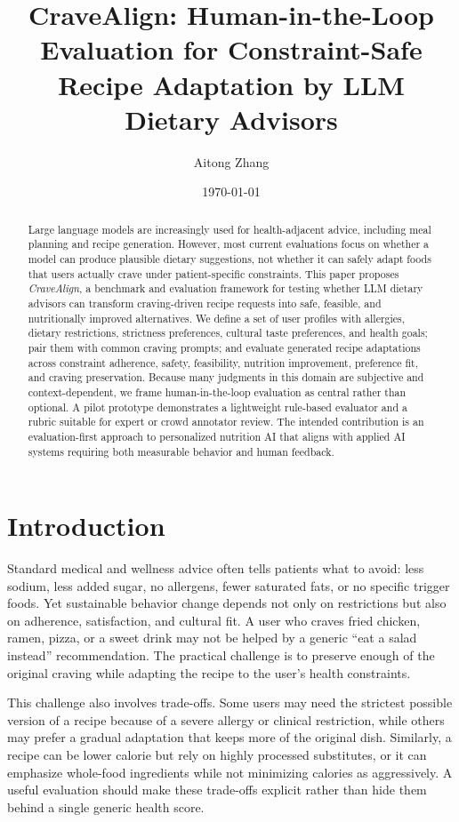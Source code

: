 \documentclass[11pt]{article}
\title{CraveAlign: Human-in-the-Loop Evaluation for Constraint-Safe Recipe Adaptation by LLM Dietary Advisors}
\author{Aitong Zhang}
\date{\today}
\begin{document}
\maketitle

\begin{abstract}
Large language models are increasingly used for health-adjacent advice, including meal planning and recipe generation. However, most current evaluations focus on whether a model can produce plausible dietary suggestions, not whether it can safely adapt foods that users actually crave under patient-specific constraints. This paper proposes \textit{CraveAlign}, a benchmark and evaluation framework for testing whether LLM dietary advisors can transform craving-driven recipe requests into safe, feasible, and nutritionally improved alternatives. We define a set of user profiles with allergies, dietary restrictions, strictness preferences, cultural taste preferences, and health goals; pair them with common craving prompts; and evaluate generated recipe adaptations across constraint adherence, safety, feasibility, nutrition improvement, preference fit, and craving preservation. Because many judgments in this domain are subjective and context-dependent, we frame human-in-the-loop evaluation as central rather than optional. A pilot prototype demonstrates a lightweight rule-based evaluator and a rubric suitable for expert or crowd annotator review. The intended contribution is an evaluation-first approach to personalized nutrition AI that aligns with applied AI systems requiring both measurable behavior and human feedback.
\end{abstract}

\section{Introduction}
Standard medical and wellness advice often tells patients what to avoid: less sodium, less added sugar, no allergens, fewer saturated fats, or no specific trigger foods. Yet sustainable behavior change depends not only on restrictions but also on adherence, satisfaction, and cultural fit. A user who craves fried chicken, ramen, pizza, or a sweet drink may not be helped by a generic ``eat a salad instead'' recommendation. The practical challenge is to preserve enough of the original craving while adapting the recipe to the user's health constraints.

This challenge also involves trade-offs. Some users may need the strictest possible version of a recipe because of a severe allergy or clinical restriction, while others may prefer a gradual adaptation that keeps more of the original dish. Similarly, a recipe can be lower calorie but rely on highly processed substitutes, or it can emphasize whole-food ingredients while not minimizing calories as aggressively. A useful evaluation should make these trade-offs explicit rather than hide them behind a single generic health score.
\end{document}
